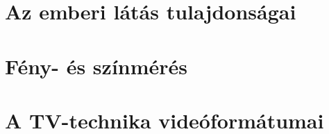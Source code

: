 \documentclass{book}
\begin{document}
\sloppy 


\titlepage
\chapter{Az emberi látás tulajdonságai}
\label{sec:HVS}
 

\chapter{Fény- és színmérés}
\label{sec:colorimetry}


\chapter{A TV-technika videóformátumai}
\label{sec:components}
 
\end{document}
